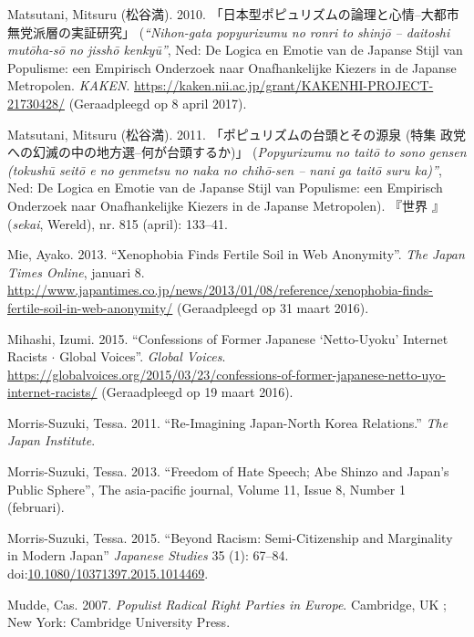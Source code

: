 \documentclass[10.5pt,dutch,]{article}
\begin{document}
\hypertarget{ref-matsutaniux5fnihon-gataux5f2010}{}
Matsutani, Mitsuru (松谷満). 2010. 「日本型ポピュリズムの論理と心情--大都市無党派層の実証研究」 (\emph{“Nihon-gata popyurizumu no ronri to shinjō -- daitoshi mutōha-sō no jisshō kenkyū”}, Ned: De Logica en Emotie van de Japanse Stijl van Populisme: een Empirisch Onderzoek naar Onafhankelijke Kiezers in de Japanse Metropolen. \emph{KAKEN}. \url{https://kaken.nii.ac.jp/grant/KAKENHI-PROJECT-21730428/} (Geraadpleegd op 8 april 2017).

\hypertarget{ref-matsutaniux5fpopyurizumuux5f2011}{}
Matsutani, Mitsuru (松谷満). 2011. 「ポピュリズムの台頭とその源泉 (特集 政党への幻滅の中の地方選--何が台頭するか)」 (\emph{Popyurizumu no taitō to sono gensen (tokushū seitō e no genmetsu no naka no chihō-sen -- nani ga taitō suru ka)”}, Ned: De Logica en Emotie van de Japanse Stijl van Populisme: een Empirisch Onderzoek naar Onafhankelijke Kiezers in de Japanse Metropolen).   『世界 』(\emph{sekai}, Wereld), nr. 815 (april): 133–41.

\hypertarget{ref-mieux5fxenophobiaux5f2013}{}
Mie, Ayako. 2013. “Xenophobia Finds Fertile Soil in Web Anonymity”. \emph{The Japan Times Online}, januari 8. \url{http://www.japantimes.co.jp/news/2013/01/08/reference/xenophobia-finds-fertile-soil-in-web-anonymity/} (Geraadpleegd op 31 maart 2016).

\hypertarget{ref-izumiux5fmihashiux5fconfessionsux5f2015}{}
Mihashi, Izumi. 2015. “Confessions of Former Japanese ‘Netto-Uyoku’ Internet Racists \(\cdot\) Global Voices”. \emph{Global Voices}. \url{https://globalvoices.org/2015/03/23/confessions-of-former-japanese-netto-uyo-internet-racists/} (Geraadpleegd op 19 maart 2016).

\hypertarget{ref-morris-suzukiux5fre-imaginingux5f2011}{}
Morris-Suzuki, Tessa. 2011. “Re-Imagining Japan-North Korea Relations.”
\emph{The Japan Institute}.

\hypertarget{ref-morris-suzukiux5ffreedomux5f2013}{}
Morris-Suzuki, Tessa. 2013. “Freedom of Hate Speech; Abe Shinzo and Japan’s Public Sphere”, The asia-pacific journal, Volume 11, Issue 8, Number 1
(februari).

\hypertarget{ref-morris-suzukiux5fbeyondux5f2015}{}
Morris-Suzuki, Tessa. 2015.  “Beyond Racism: Semi-Citizenship and Marginality in Modern Japan” \emph{Japanese Studies} 35 (1): 67--84.
doi:\href{https://doi.org/10.1080/10371397.2015.1014469}{10.1080/10371397.2015.1014469}.

\hypertarget{ref-muddeux5fpopulistux5f2007}{}
Mudde, Cas. 2007. \emph{Populist Radical Right Parties in Europe}.
Cambridge, UK ; New York: Cambridge University Press.
\end{document}
